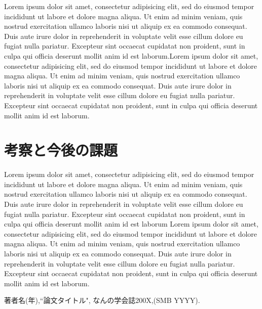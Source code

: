 \documentclass[a4j,10pt, twocolumn]{jarticle}
\begin{document}
Lorem ipsum dolor sit amet, consectetur adipisicing elit, sed do eiusmod tempor incididunt ut labore et dolore magna aliqua. Ut enim ad minim veniam, quis nostrud exercitation ullamco laboris nisi ut aliquip ex ea commodo consequat. Duis aute irure dolor in reprehenderit in voluptate velit esse cillum dolore eu fugiat nulla pariatur. Excepteur sint occaecat cupidatat non proident, sunt in culpa qui officia deserunt mollit anim id est laborum.Lorem ipsum dolor sit amet, consectetur adipisicing elit, sed do eiusmod tempor incididunt ut labore et dolore magna aliqua. Ut enim ad minim veniam, quis nostrud exercitation ullamco laboris nisi ut aliquip ex ea commodo consequat. Duis aute irure dolor in reprehenderit in voluptate velit esse cillum dolore eu fugiat nulla pariatur. Excepteur sint occaecat cupidatat non proident, sunt in culpa qui officia deserunt mollit anim id est laborum.
\section{考察と今後の課題}
Lorem ipsum dolor sit amet, consectetur adipisicing elit, sed do eiusmod tempor incididunt ut labore et dolore magna aliqua. Ut enim ad minim veniam, quis nostrud exercitation ullamco laboris nisi ut aliquip ex ea commodo consequat. Duis aute irure dolor in reprehenderit in voluptate velit esse cillum dolore eu fugiat nulla pariatur. Excepteur sint occaecat cupidatat non proident, sunt in culpa qui officia deserunt mollit anim id est laborum
Lorem ipsum dolor sit amet, consectetur adipisicing elit, sed do eiusmod tempor incididunt ut labore et dolore magna aliqua. Ut enim ad minim veniam, quis nostrud exercitation ullamco laboris nisi ut aliquip ex ea commodo consequat. Duis aute irure dolor in reprehenderit in voluptate velit esse cillum dolore eu fugiat nulla pariatur. Excepteur sint occaecat cupidatat non proident, sunt in culpa qui officia deserunt mollit anim id est laborum.



\begin{thebibliography}{3}
 \label{takada}
著者名(年),``論文タイトル", なんの学会誌200X,(SMB YYYY).
\end{thebibliography}
\end{document}
